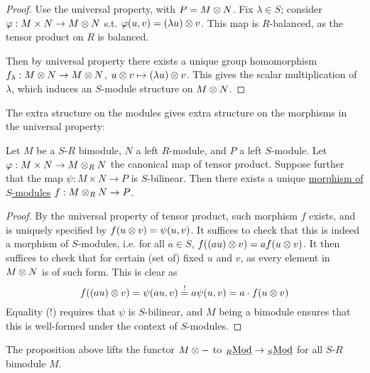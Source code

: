 \begin{proof}
    Use the universal property, with $P = M \otimes N$. Fix $\lambda \in S$; consider $\varphi: M \times N \to M \otimes N$ s.t. $\varphi(u, v) = (\lambda u) \otimes v$. This map is $R$-balanced, as the tensor product on $R$ is balanced. 
    
    Then by universal property there exists a unique group homomorphism $f_{\lambda}: M \otimes N \to M \otimes N$, $u \otimes v \mapsto (\lambda u) \otimes v$. This gives the scalar multiplication of $\lambda$, which induces an $S$-module structure on $M \otimes N$.
\end{proof}

\begin{proposition}
    The extra structure on the modules gives extra structure on the morphisms in the universal property:

    Let $M$ be a $S$-$R$ bimodule, $N$ a left $R$-module, and $P$ a left $S$-module. Let $\varphi: M \times N \to M \otimes_R N$ the canonical map of tensor product. Suppose further that the map $\psi: M \times N \to P$ is $S$-bilinear. Then there exists a unique \underline{morphism of $S$-modules} $f: M \otimes_R N \to P$.
\end{proposition}

\begin{proof}
    By the universal property of tensor product, such morphism $f$ exists, and is uniquely specified by $f(u \otimes v) = \psi(u, v)$. It suffices to check that this is indeed a morphism of $S$-modules, i.e. for all $a \in S$, $f((au) \otimes v) = a f(u \otimes v)$. It then suffices to check that for certain (set of) fixed $u$ and $v$, as every element in $M \otimes N$ is of such form. This is clear as
    \[
        f((au) \otimes v) = \psi(au, v) \overset{!}{=} a\psi(u, v) = a\cdot f(u \otimes v)
    \]
    Equality (!) requires that $\psi$ is $S$-bilinear, and $M$ being a bimodule ensures that this is well-formed under the context of $S$-modules. 
\end{proof}

\begin{remark}
    The proposition above lifts the functor $M \otimes -$ to ${}_{R}\underline{\textup{Mod}} \to {}_{S}\underline{\textup{Mod}}$ for all $S$-$R$ bimodule $M$.
\end{remark}

